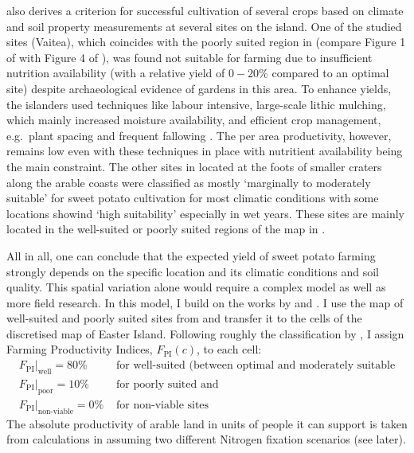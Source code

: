 \citet{Louwagie2006} also derives a criterion for successful cultivation of several crops based on climate and soil property measurements at several sites on the island. 
One of the studied sites (Vaitea), which coincides with the poorly suited region in \citet{Puleston2017} (compare Figure 1 of \citet{Louwagie2006} with Figure 4 of \citet{Puleston2017}), was found not suitable for farming due to insufficient nutrition availability (with a relative yield of $0-20\%$ compared to an optimal site) despite archaeological evidence of gardens in this area.
To enhance yields, the islanders used techniques like labour intensive, large-scale lithic mulching, which mainly increased moisture availability, and efficient crop management, e.g.\ plant spacing and frequent fallowing \citep{Louwagie2006}.
The per area productivity, however, remains low even with these techniques in place with nutritient availability being the main constraint.
The other sites in \citet{Louwagie2006} located at the foots of smaller craters along the arable coasts were classified as mostly `marginally to moderately suitable' for sweet potato cultivation for most climatic conditions with some locations showind `high suitability' especially in wet years. 
These sites are mainly located in the well-suited or poorly suited regions of the map in \citet{Pulestion2017}.

All in all, one can conclude that the expected yield of sweet potato farming strongly depends on the specific location and its climatic conditions and soil quality.
This spatial variation alone would require a complex model as well as more field research.
In this model, I build on the works by \citep{Puleston2017} and \citet{Louwagie2006}.
I use the map of well-suited and poorly suited sites from \citet{Puleston2017} and transfer it to the cells of the discretised map of Easter Island.
Following roughly the classification by \citet{Louwagie2006}, I assign Farming Productivity Indices, $F_\text{PI}(c)$, to each cell:
\begin{eqnarray*}
F_\text{PI}|_\text{well} = 80\% & \text{ for well-suited (between optimal and moderately suitable}\\
F_\text{PI}|_\text{poor} = 10\%  & \text{ for poorly suited and}\\ F_\text{PI}|_\text{non-viable} = 0\% & \text{ for non-viable sites}
\end{eqnarray*}
The absolute productivity of arable land in units of people it can support is taken from calculations in \citet{Puleston2017} assuming two different Nitrogen fixation scenarios (see later).

